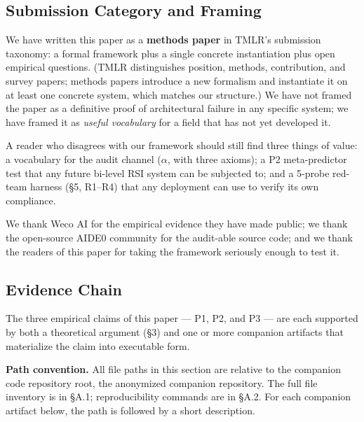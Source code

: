 \subsection{Submission Category and Framing}

We have written this paper as a \textbf{methods paper} in TMLR's submission taxonomy: a formal framework plus a single concrete instantiation plus open empirical questions. (TMLR distinguishes position, methods, contribution, and survey papers; methods papers introduce a new formalism and instantiate it on at least one concrete system, which matches our structure.) We have not framed the paper as a definitive proof of architectural failure in any specific system; we have framed it as \emph{useful vocabulary} for a field that has not yet developed it.

A reader who disagrees with our framework should still find three things of value: a vocabulary for the audit channel ($\alpha$, with three axioms); a P2 meta-predictor test that any future bi-level RSI system can be subjected to; and a 5-probe red-team harness (\S5, R1--R4) that any deployment can use to verify its own compliance.

We thank Weco AI for the empirical evidence they have made public; we thank the open-source AIDE0 community for the audit-able source code; and we thank the readers of this paper for taking the framework seriously enough to test it.

\subsection{Evidence Chain}

The three empirical claims of this paper --- P1, P2, and P3 --- are each supported by both a theoretical argument (\S3) and one or more companion artifacts that materialize the claim into executable form.

\textbf{Path convention.} All file paths in this section are relative to the companion code repository root, the anonymized companion repository. The full file inventory is in \S A.1; reproducibility commands are in \S A.2. For each companion artifact below, the path is followed by a short description.

